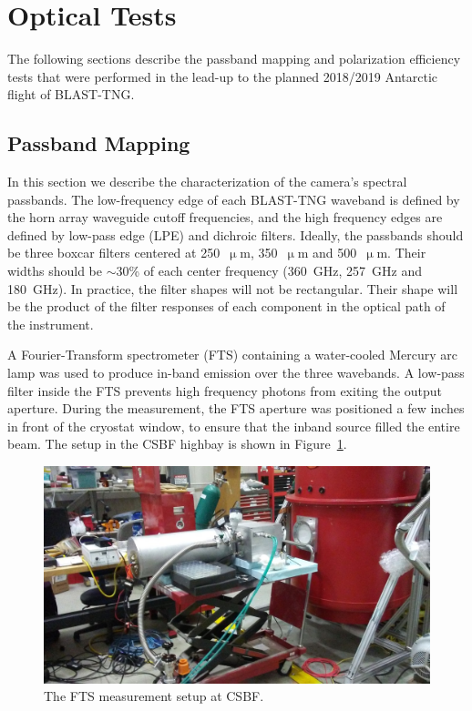 \section{Optical Tests}\label{optical tests}

The following sections describe the passband mapping and polarization efficiency tests that were performed in the lead-up to the planned 2018/2019 Antarctic flight of BLAST-TNG.

\subsection{Passband Mapping}\label{fts}

In this section we describe the characterization of the camera's spectral passbands. The low-frequency edge of each BLAST-TNG waveband is defined by the horn array waveguide cutoff frequencies, and the high frequency edges are defined by low-pass edge (LPE) and dichroic filters. Ideally, the passbands should be three boxcar filters centered at 250~$\upmu$m, 350~$\upmu$m and 500~$\upmu$m. Their widths should be $\sim$30\% of each center frequency (360~GHz, 257~GHz and 180~GHz). In practice, the filter shapes will not be rectangular. Their shape will be the product of the filter responses of each component in the optical path of the instrument.

A Fourier-Transform spectrometer (FTS) containing a water-cooled Mercury arc lamp was used to produce in-band emission over the three wavebands. A low-pass filter inside the FTS prevents high frequency photons from exiting the output aperture. During the measurement, the FTS aperture was positioned a few inches in front of the cryostat window, to ensure that the inband source filled the entire beam. The setup in the CSBF highbay is shown in Figure~\ref{fig:fts setup}.

\begin{figure}[!htbp]
\centering
\includegraphics[width=\textwidth]{figures/blast_data/fts/fts_setup}
\caption{The FTS measurement setup at CSBF.}
\label{fig:fts setup}
\end{figure}

